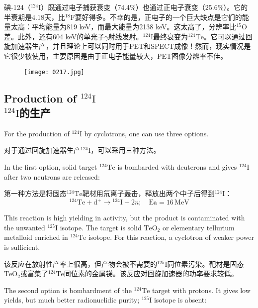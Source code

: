 \documentclass[dvipsnames, svgnames,a4paper,11pt]{article}
\begin{document}
碘-124（\(\mathrm{^{124}I}\)）既通过电子捕获衰变（74.4\%）也通过正电子衰变（25.6\%）。它的半衰期是4.18天，比\(\mathrm{^{18}F}\)要好得多。不幸的是，正电子的一个巨大缺点是它们的能量太高：平均能量为819 keV，而最大能量为2138 keV。这太高了，分辨率比\(\mathrm{^{15}O}\)差。此外，还有604 keV的单光子$\gamma$射线发射。\(\mathrm{^{124}I}\)最终衰变为\(\mathrm{^{124}Te}\)。它可以通过回旋加速器生产，并且理论上可以同时用于PET和SPECT成像！然而，现实情况是它很少被使用，主要原因是由于正电子能量较大，PET图像分辨率不佳。

\begin{figure}[h]
	\centering
    \texttt{[image: 0217.jpg]}  
     \label{fig271}
\end{figure}


\subsection{Production of \(\mathrm{^{124}I}\)\\ \(\mathrm{^{124}I}\)的生产}  
For the production of \(\mathrm{^{124}I}\) by cyclotrons, one can use three options.  

对于通过回旋加速器生产\(\mathrm{^{124}I}\)，可以采用三种方法。  

In the first option, solid target \(\mathrm{^{124}Te}\) is bombarded with deuterons and gives \(\mathrm{^{124}I}\) after two neutrons are released:  

第一种方法是将固态\(\mathrm{^{124}Te}\)靶材用氘离子轰击，释放出两个中子后得到\(\mathrm{^{124}I}\)：  
\[
\mathrm{^{124}Te} + \mathrm{d}^+ \rightarrow \mathrm{^{124}I} + 2n; \quad \text{Ea} = 16 \, \text{MeV}
\]  

This reaction is high yielding in activity, but the product is contaminated with the unwanted \(\mathrm{^{125}I}\) isotope. The target is solid \(\mathrm{TeO_2}\) or elementary tellurium metalloid enriched in \(\mathrm{^{124}Te}\) isotope. For this reaction, a cyclotron of weaker power is sufficient.  

该反应在放射性产率上很高，但产物会被不需要的\(\mathrm{^{125}I}\)同位素污染。靶材是固态\(\mathrm{TeO_2}\)或富集了\(\mathrm{^{124}Te}\)同位素的金属锑。该反应对回旋加速器的功率要求较低。  

The second option is bombardment of the \(\mathrm{^{124}Te}\) target with protons. It gives low yields, but much better radionuclidic purity; \(\mathrm{^{125}I}\) isotope is absent:  
\end{document}

